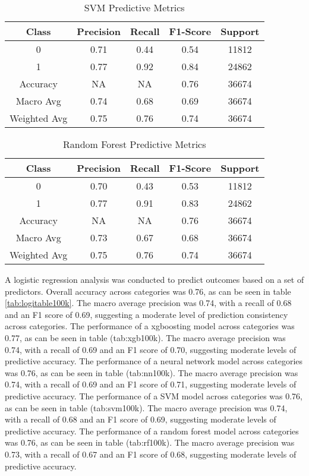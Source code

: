 \documentclass[
  man]{apa7}
\begin{document}
\begin{table}
\centering
\caption{\label{tab:svm100k}SVM Predictive Metrics}
\centering
\fontsize{12}{14}\selectfont
\begin{tabular}[t]{c|c|c|c|c}
\hline
Class & Precision & Recall & F1-Score & Support\\
\hline
0 & 0.71 & 0.44 & 0.54 & 11812\\
\hline
1 & 0.77 & 0.92 & 0.84 & 24862\\
\hline
Accuracy & NA & NA & 0.76 & 36674\\
\hline
Macro Avg & 0.74 & 0.68 & 0.69 & 36674\\
\hline
Weighted Avg & 0.75 & 0.76 & 0.74 & 36674\\
\hline
\end{tabular}
\end{table}

\begin{table}
\centering
\caption{\label{tab:rf100k}Random Forest Predictive Metrics}
\centering
\fontsize{12}{14}\selectfont
\begin{tabular}[t]{c|c|c|c|c}
\hline
Class & Precision & Recall & F1-Score & Support\\
\hline
0 & 0.70 & 0.43 & 0.53 & 11812\\
\hline
1 & 0.77 & 0.91 & 0.83 & 24862\\
\hline
Accuracy & NA & NA & 0.76 & 36674\\
\hline
Macro Avg & 0.73 & 0.67 & 0.68 & 36674\\
\hline
Weighted Avg & 0.75 & 0.76 & 0.74 & 36674\\
\hline
\end{tabular}
\end{table}

A logistic regression analysis was conducted to predict outcomes based on a set of predictors. Overall accuracy across categories was 0.76, as can be seen in table \ref{tab:logitable100k}. The macro average precision was 0.74, with a recall of 0.68 and an F1 score of 0.69, suggesting a moderate level of prediction consistency across categories.
The performance of a xgboosting model across categories was 0.77, as can be seen in table (tab:xgb100k). The macro average precision was 0.74, with a recall of 0.69 and an F1 score of 0.70, suggesting moderate levels of predictive accuracy.
The performance of a neural network model across categories was 0.76, as can be seen in table (tab:nn100k). The macro average precision was 0.74, with a recall of 0.69 and an F1 score of 0.71, suggesting moderate levels of predictive accuracy.
The performance of a SVM model across categories was 0.76, as can be seen in table (tab:svm100k). The macro average precision was 0.74, with a recall of 0.68 and an F1 score of 0.69, suggesting moderate levels of predictive accuracy.
The performance of a random forest model across categories was 0.76, as can be seen in table (tab:rf100k). The macro average precision was 0.73, with a recall of 0.67 and an F1 score of 0.68, suggesting moderate levels of predictive accuracy.
\end{document}
